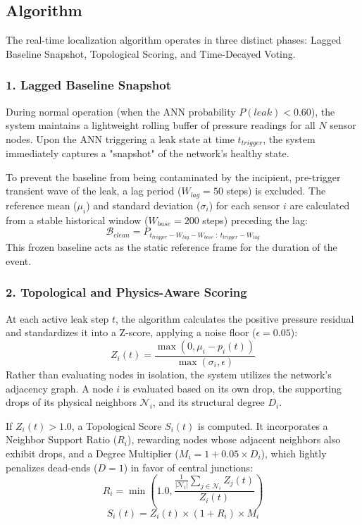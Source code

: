 \documentclass[final,5p,times,twocolumn,authoryear]{elsarticle}
\begin{document}
\subsection{Algorithm}
The real-time localization algorithm operates in three distinct phases: Lagged Baseline Snapshot, Topological Scoring, and Time-Decayed Voting.

\subsubsection{1. Lagged Baseline Snapshot}
During normal operation (when the ANN probability $P(leak) < 0.60$), the system maintains a lightweight rolling buffer of pressure readings for all $N$ sensor nodes. Upon the ANN triggering a leak state at time $t_{trigger}$, the system immediately captures a "snapshot" of the network's healthy state. 

To prevent the baseline from being contaminated by the incipient, pre-trigger transient wave of the leak, a lag period ($W_{lag} = 50$ steps) is excluded. The reference mean ($\mu_i$) and standard deviation ($\sigma_i$) for each sensor $i$ are calculated from a stable historical window ($W_{base} = 200$ steps) preceding the lag:
\begin{equation}
    \mathcal{B}_{clean} = P_{t_{trigger} - W_{lag} - W_{base} \ : \ t_{trigger} - W_{lag}}
\end{equation}
This frozen baseline acts as the static reference frame for the duration of the event.

\subsubsection{2. Topological and Physics-Aware Scoring}
At each active leak step $t$, the algorithm calculates the positive pressure residual and standardizes it into a Z-score, applying a noise floor ($\epsilon = 0.05$):
\begin{equation}
    Z_i(t) = \frac{\max(0, \mu_i - p_i(t))}{\max(\sigma_i, \epsilon)}
\end{equation}
Rather than evaluating nodes in isolation, the system utilizes the network's adjacency graph. A node $i$ is evaluated based on its own drop, the supporting drops of its physical neighbors $\mathcal{N}_i$, and its structural degree $D_i$. 

If $Z_i(t) > 1.0$, a Topological Score $S_i(t)$ is computed. It incorporates a Neighbor Support Ratio ($R_i$), rewarding nodes whose adjacent neighbors also exhibit drops, and a Degree Multiplier ($M_i = 1 + 0.05 \times D_i$), which lightly penalizes dead-ends ($D=1$) in favor of central junctions:
\begin{equation}
    R_i = \min\left(1.0, \frac{\frac{1}{|\mathcal{N}_i|} \sum_{j \in \mathcal{N}_i} Z_j(t)}{Z_i(t)}\right)
\end{equation}
\begin{equation}
    S_i(t) = Z_i(t) \times (1 + R_i) \times M_i
\end{equation}
\end{document}
